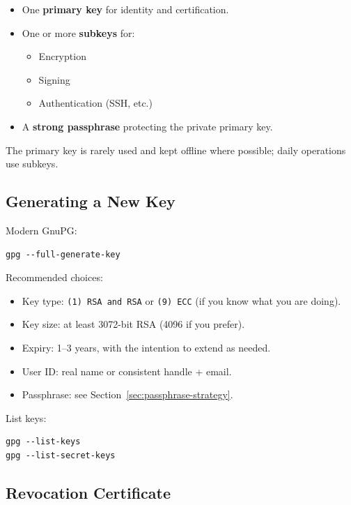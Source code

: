\documentclass[11pt,a4paper]{article}
\begin{document}
\begin{itemize}[noitemsep]
  \item One \textbf{primary key} for identity and certification.
  \item One or more \textbf{subkeys} for:
    \begin{itemize}[noitemsep]
      \item Encryption
      \item Signing
      \item Authentication (SSH, etc.)
    \end{itemize}
  \item A \textbf{strong passphrase} protecting the private primary key.
\end{itemize}

The primary key is rarely used and kept offline where possible; daily operations use subkeys.

\subsection{Generating a New Key}

Modern GnuPG:

\begin{verbatim}
gpg --full-generate-key
\end{verbatim}

Recommended choices:

\begin{itemize}[noitemsep]
  \item Key type: \texttt{(1) RSA and RSA} or \texttt{(9) ECC} (if you know what you are doing).
  \item Key size: at least 3072-bit RSA (4096 if you prefer).
  \item Expiry: 1--3 years, with the intention to extend as needed.
  \item User ID: real name or consistent handle + email.
  \item Passphrase: see Section~\ref{sec:passphrase-strategy}.
\end{itemize}

List keys:

\begin{verbatim}
gpg --list-keys
gpg --list-secret-keys
\end{verbatim}

\subsection{Revocation Certificate}
\end{document}
